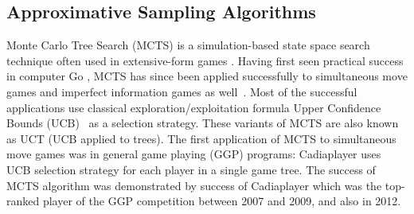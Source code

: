 
\subsection{Approximative Sampling Algorithms} \label{sec:related:sampling}

Monte Carlo Tree Search (MCTS) is a simulation-based state space search technique often used in extensive-form games \cite{Coulom06,UCT}. 
Having first seen practical success in computer Go \cite{Gelly2011,Gelly12}, MCTS has since been applied successfully to simultaneous move games and imperfect information games as well~\cite{Ciancarini10Kriegspiel}. 
Most of the successful applications use classical exploration/exploitation formula Upper Confidence Bounds (UCB)~\cite{UCB} as a selection strategy. These variants of MCTS are also known as UCT (UCB applied to trees). The first application of MCTS to simultaneous move games was in general game playing (GGP) \cite{GGP} programs: {\sc Cadiaplayer} \cite{Cadiaplayer,Finnsson12} uses UCB selection strategy for each player in a single game tree. The success of MCTS algorithm was demonstrated by success of {\sc Cadiaplayer} which was the top-ranked player of the GGP competition between 2007 and 2009, and also in 2012.


